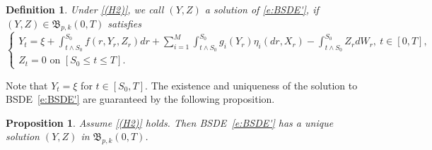 \documentclass[11pt,reqno]{amsart}
\newtheorem{definition}{Definition}[section]
\newtheorem{proposition}{Proposition}[section]
\numberwithin{equation}{section}
\begin{document}
\begin{definition}\label{def:BSDE'}
Under \ref{(H2)}, we call $(Y,Z)$ a solution of \eqref{e:BSDE'}, if $(Y,Z)\in\mathfrak{B}_{p,k}(0,T)$ satisfies 	\begin{equation}\label{e:bsde-3}
\begin{cases}
\displaystyle Y_{t} = \xi + \int_{t\wedge S_{0}}^{S_{0}}f(r,Y_{r},Z_{r})dr + \sum\limits_{i=1}^{M}\int_{t\wedge S_0}^{S_{0}}g_{i}(Y_{r})\eta_{i}(dr,X_{r}) - \int_{t\wedge S_0}^{S_{0}}Z_{r}dW_{r},  ~t\in[0,T],\\
Z_{t}= 0 \text{ on }[S_{0}\le t\le T].
\end{cases}
\end{equation}
\end{definition}

Note that $Y_{t} = \xi$ for $t \in  [S_{0},T].$ The existence and uniqueness of the solution to BSDE~\eqref{e:BSDE'} are guaranteed by the following proposition. 

\begin{proposition}\label{prop:SPDE-BSDE with stopping times}
Assume \ref{(H2)} holds. Then BSDE~\eqref{e:BSDE'} has a unique solution $(Y,Z)$ in $\mathfrak{B}_{p,k}(0,T)$.
\end{proposition}
\end{document}
